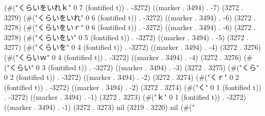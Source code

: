 (#("くらいをいれｋ" 0 7 (fontified t)) . -3272) ((marker . 3494) . -7) (3272 . 3279) (#("くらいをいれ" 0 6 (fontified t)) . -3272) ((marker . 3494) . -6) (3272 . 3278) (#("くらいをいｒ" 0 6 (fontified t)) . -3272) ((marker . 3494) . -6) (3272 . 3278) (#("くらいをい" 0 5 (fontified t)) . -3272) ((marker . 3494) . -5) (3272 . 3277) (#("くらいを" 0 4 (fontified t)) . -3272) ((marker . 3494) . -4) (3272 . 3276) (#("くらいｗ" 0 4 (fontified t)) . -3272) ((marker . 3494) . -4) (3272 . 3276) (#("くらい" 0 3 (fontified t)) . -3272) ((marker . 3494) . -3) (3272 . 3275) (#("くら" 0 2 (fontified t)) . -3272) ((marker . 3494) . -2) (3272 . 3274) (#("くｒ" 0 2 (fontified t)) . -3272) ((marker . 3494) . -2) (3272 . 3274) (#("く" 0 1 (fontified t)) . -3272) ((marker . 3494) . -1) (3272 . 3273) (#("ｋ" 0 1 (fontified t)) . -3272) ((marker . 3494) . -1) (3272 . 3273) nil (3219 . 3220) nil (#("
